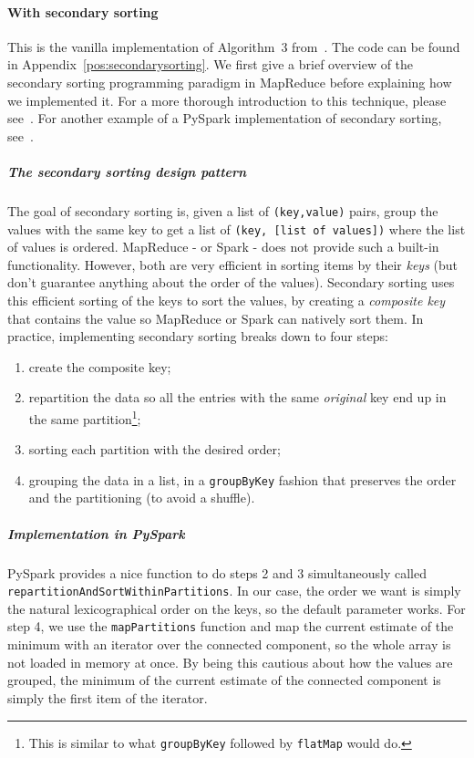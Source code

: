 \documentclass[a4paper,12pt]{article}
\begin{document}
\paragraph{With secondary sorting}
This is the vanilla implementation of Algorithm~3 from~\cite{kardes2014ccf}. The code can be found in Appendix~\ref{pos:secondarysorting}. We first give a brief overview of the secondary sorting programming paradigm in MapReduce before explaining how we implemented it. For a more thorough introduction to this technique, please see~\cite{lin2010data}. For another example of a PySpark implementation of secondary sorting, see~\cite{secondary}.
\subparagraph{The secondary sorting design pattern} The goal of secondary sorting is, given a list of \verb|(key,value)| pairs, group the values with the same key to get a list of \verb|(key, [list of values])| where the list of values is ordered. MapReduce - or Spark - does not provide such a built-in functionality. However, both are very efficient in sorting items by their \emph{keys} (but don't guarantee anything about the order of the values). Secondary sorting uses this efficient sorting of the keys to sort the values, by creating a \emph{composite key} that contains the value so MapReduce or Spark can natively sort them. In practice, implementing secondary sorting breaks down to four steps:
\begin{enumerate}
    \item create the composite key;
    \item repartition the data so all the entries with the same \emph{original} key end up in the same partition\footnote{This is similar to what \texttt{groupByKey} followed by \texttt{flatMap} would do.};
    \item sorting each partition with the desired order;
    \item grouping the data in a list, in a \verb|groupByKey| fashion that preserves the order and the partitioning (to avoid a shuffle).
\end{enumerate}
\subparagraph{Implementation in PySpark} PySpark provides a nice function to do steps 2 and 3 simultaneously called \verb|repartitionAndSortWithinPartitions|. In our case, the order we want is simply the natural lexicographical order on the keys, so the default parameter works. For step 4, we use the \verb|mapPartitions| function and map the current estimate of the minimum with an iterator over the connected component, so the whole array is not loaded in memory at once. By being this cautious about how the values are grouped, the minimum of the current estimate of the connected component is simply the first item of the iterator.
\end{document}
